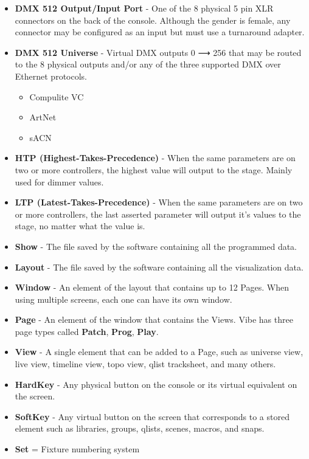 \documentclass[
]{article}
\providecommand{\tightlist}{%
  \setlength{\itemsep}{0pt}\setlength{\parskip}{0pt}}
\begin{document}
\begin{itemize}
\item
  \textbf{DMX 512 Output/Input Port} - One of the 8 physical 5 pin XLR connectors on the back of the console. Although the gender is female, any connector may be configured as an input but must use a turnaround adapter.
\item
  \textbf{DMX 512 Universe} - Virtual DMX outputs 0 ⟶ 256 that may be routed to the 8 physical outputs and/or any of the three supported DMX over Ethernet protocols.

  \begin{itemize}
  \tightlist
  \item
    Compulite VC
  \item
    ArtNet
  \item
    sACN
  \end{itemize}
\item
  \textbf{HTP (Highest-Takes-Precedence)} - When the same parameters are on two or more controllers, the highest value will output to the stage. Mainly used for dimmer values.
\item
  \textbf{LTP (Latest-Takes-Precedence)} - When the same parameters are on two or more controllers, the last asserted parameter will output it's values to the stage, no matter what the value is.
\item
  \textbf{Show} - The file saved by the software containing all the programmed data.
\item
  \textbf{Layout} - The file saved by the software containing all the visualization data.
\item
  \textbf{Window} - An element of the layout that contains up to 12 Pages. When using multiple screens, each one can have its own window.
\item
  \textbf{Page} - An element of the window that contains the Views. Vibe has three page types called \textbf{Patch}, \textbf{Prog}, \textbf{Play}.
\item
  \textbf{View} - A single element that can be added to a Page, such as universe view, live view, timeline view, topo view, qlist tracksheet, and many others.
\item
  \textbf{HardKey} - Any physical button on the console or its virtual equivalent on the screen.
\item
  \textbf{SoftKey} - Any virtual button on the screen that corresponds to a stored element such as libraries, groups, qlists, scenes, macros, and snaps.
\item
  \textbf{Set} = Fixture numbering system


\end{itemize}
\end{document}
